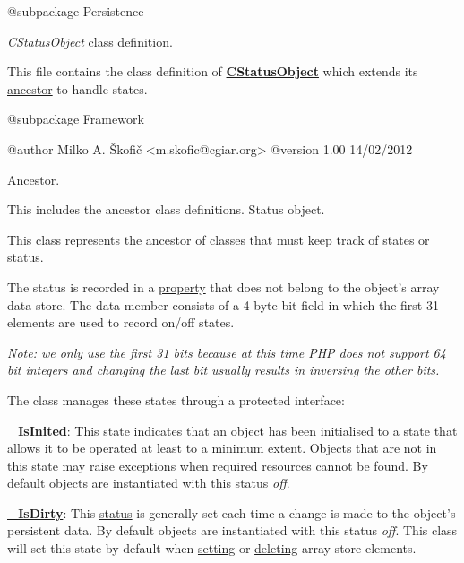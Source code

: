 \begin{DoxyVerb}    @subpackage     Persistence\end{DoxyVerb}


{\itshape \hyperlink{class_c_status_object}{C\-Status\-Object}} class definition.

This file contains the class definition of {\bfseries \hyperlink{class_c_status_object}{C\-Status\-Object}} which extends its \hyperlink{class_c_array_object}{ancestor} to handle states.

\begin{DoxyVerb}    @subpackage     Framework

    @author         Milko A. Škofič <m.skofic@cgiar.org>
    @version        1.00 14/02/2012\end{DoxyVerb}


Ancestor.

This includes the ancestor class definitions. Status object.

This class represents the ancestor of classes that must keep track of states or status.

The status is recorded in a \hyperlink{}{property} that does not belong to the object's array data store. The data member consists of a 4 byte bit field in which the first 31 elements are used to record on/off states.

{\itshape Note\-: we only use the first 31 bits because at this time P\-H\-P does not support 64 bit integers and changing the last bit usually results in inversing the other bits.}

The class manages these states through a protected interface\-:


\begin{DoxyItemize}
\item {\bfseries \hyperlink{}{\-\_\-\-Is\-Inited}}\-: This state indicates that an object has been initialised to a \hyperlink{}{state} that allows it to be operated at least to a minimum extent. Objects that are not in this state may raise \hyperlink{}{exceptions} when required resources cannot be found. By default objects are instantiated with this status {\itshape off}. 
\item {\bfseries \hyperlink{}{\-\_\-\-Is\-Dirty}}\-: This \hyperlink{}{status} is generally set each time a change is made to the object's persistent data. By default objects are instantiated with this status {\itshape off}. This class will set this state by default when \hyperlink{}{setting} or \hyperlink{}{deleting} array store elements. 
\end{DoxyItemize}

